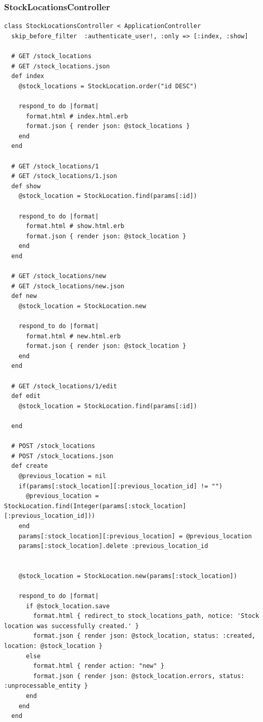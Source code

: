 \documentclass[a4paper]{article}
\begin{document}
\subsubsection{StockLocationsController}
\begin{verbatim}
class StockLocationsController < ApplicationController
  skip_before_filter  :authenticate_user!, :only => [:index, :show]

  # GET /stock_locations
  # GET /stock_locations.json
  def index
    @stock_locations = StockLocation.order("id DESC")

    respond_to do |format|
      format.html # index.html.erb
      format.json { render json: @stock_locations }
    end
  end

  # GET /stock_locations/1
  # GET /stock_locations/1.json
  def show
    @stock_location = StockLocation.find(params[:id])

    respond_to do |format|
      format.html # show.html.erb
      format.json { render json: @stock_location }
    end
  end

  # GET /stock_locations/new
  # GET /stock_locations/new.json
  def new
    @stock_location = StockLocation.new

    respond_to do |format|
      format.html # new.html.erb
      format.json { render json: @stock_location }
    end
  end

  # GET /stock_locations/1/edit
  def edit
    @stock_location = StockLocation.find(params[:id])

  end

  # POST /stock_locations
  # POST /stock_locations.json
  def create
    @previous_location = nil
    if(params[:stock_location][:previous_location_id] != "") 
      @previous_location = StockLocation.find(Integer(params[:stock_location][:previous_location_id]))
    end
    params[:stock_location][:previous_location] = @previous_location
    params[:stock_location].delete :previous_location_id


    @stock_location = StockLocation.new(params[:stock_location])

    respond_to do |format|
      if @stock_location.save
        format.html { redirect_to stock_locations_path, notice: 'Stock location was successfully created.' }
        format.json { render json: @stock_location, status: :created, location: @stock_location }
      else
        format.html { render action: "new" }
        format.json { render json: @stock_location.errors, status: :unprocessable_entity }
      end
    end
  end


\end{verbatim}
\end{document}
